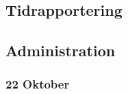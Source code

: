 \documentclass[a4paper]{article}
\begin{document}
\subsection{Tidrapportering}








\subsection{Administration}

\subsubsection{22 Oktober}
\end{document}
